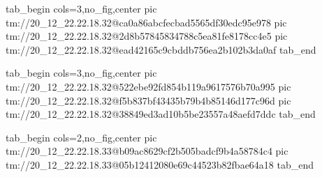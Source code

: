  
 
 
 
 

\qqSecCmtScr


\ifcmt
  tab_begin cols=3,no_fig,center
    pic tm://20_12_22.22.18.32@ca0a86abcfecbad5565df30edc95e978
    pic tm://20_12_22.22.18.32@2d8b57845834788c5ea81fe8178cc4e5
    pic tm://20_12_22.22.18.32@ead42165c9cbddb756ea2b102b3da0af
  tab_end
\fi


\ifcmt
  tab_begin cols=3,no_fig,center
    pic tm://20_12_22.22.18.32@522ebe92fd854b119a9617576b70a995
    pic tm://20_12_22.22.18.32@f5b837bf43435b79b4b85146d177c96d
    pic tm://20_12_22.22.18.32@38849ed3ad10b5be23557a48aefd7ddc
  tab_end
\fi


\ifcmt
  tab_begin cols=2,no_fig,center
    pic tm://20_12_22.22.18.33@b09ac8629cf2b505badcf9b4a58784c4
    pic tm://20_12_22.22.18.33@05b12412080e69c44523b82fbae64a18
  tab_end
\fi

